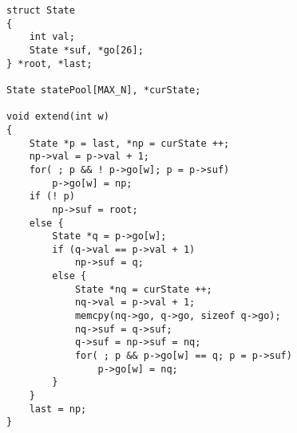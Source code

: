 \begin{lstlisting}
struct State
{
	int val;
	State *suf, *go[26];
} *root, *last;

State statePool[MAX_N], *curState;

void extend(int w)
{
	State *p = last, *np = curState ++;
	np->val = p->val + 1;
	for( ; p && ! p->go[w]; p = p->suf)
		p->go[w] = np;
	if (! p)
		np->suf = root;
	else {
		State *q = p->go[w];
		if (q->val == p->val + 1)
			np->suf = q;
		else {
			State *nq = curState ++;
			nq->val = p->val + 1;
			memcpy(nq->go, q->go, sizeof q->go);
			nq->suf = q->suf;
			q->suf = np->suf = nq;
			for( ; p && p->go[w] == q; p = p->suf)
				p->go[w] = nq;
		}
	}
	last = np;
}
\end{lstlisting}

